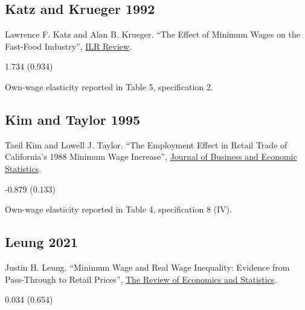 \subsection*{Katz and Krueger 1992}
\vspace{-0.7em}

\noindent Lawrence F. Katz and Alan B. Krueger. ``The Effect of Minimum Wages on the Fast-Food Industry'', \href{https://doi.org/10.1177/001979399204600102}{ILR Review}.

\vspace{0.7em}

 1.734 (0.934)

\vspace{0.7em}

 Own-wage elasticity reported in Table 5, specification 2.

\subsection*{Kim and Taylor 1995}
\vspace{-0.7em}

\noindent Taeil Kim and Lowell J. Taylor. ``The Employment Effect in Retail Trade of California’s 1988 Minimum Wage Increase'', \href{https://doi.org/10.1080/07350015.1995.10524591}{Journal of Business and Economic Statistics}.

\vspace{0.7em}

 -0.879 (0.133)

\vspace{0.7em}

 Own-wage elasticity reported in Table 4, specification 8 (IV).

\subsection*{Leung 2021}
\vspace{-0.7em}

\noindent Justin H. Leung. ``Minimum Wage and Real Wage Inequality: Evidence from Pass-Through to Retail Prices'', \href{https://doi.org/10.1162/rest_a_00915}{The Review of Economics and Statistics}.

\vspace{0.7em}

 0.034 (0.654)

